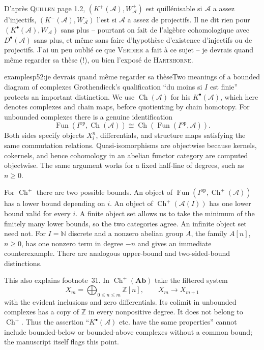 D'après \textsc{Quillen} page 1.2, $(K^{+}(\mathcal{A}),W_{\mathcal{A}}^{+})$ est quillénisable si $\mathcal{A}$ a assez d'injectifs, $(K^{-}(\mathcal{A}),W_{\mathcal{A}}^{-})$ l'est si $\mathcal{A}$ a assez de projectifs. Il ne dit rien pour $(K^{\bullet}(\mathcal{A}),W_{\mathcal{A}})$ sans plus -- pourtant on fait de l'algèbre cohomologique avec $D^{\bullet}(\mathcal{A})$ sans plus, et même sans faire d'hypothèse d'existence d'injectifs ou de projectifs. J'ai un peu oublié ce que \textsc{Verdier} a fait à ce sujet -- je devrais quand même regarder sa thèse (!), ou bien l'exposé de \textsc{Hartshorne}.

\begin{dcomment}{examples}{p52:je devrais quand même regarder sa thèse}{Two meanings of a bounded diagram of complexes}
Grothendieck's qualification ``du moins si $I$ est finie'' protects an important distinction. We use $\operatorname{Ch}(\mathcal A)$ for his $K^\bullet(\mathcal A)$, which here denotes complexes and chain maps, before quotienting by chain homotopy. For unbounded complexes there is a genuine identification
\[
 \operatorname{Fun}(I^{\mathrm{op}},\operatorname{Ch}(\mathcal A))
 \cong\operatorname{Ch}(\operatorname{Fun}(I^{\mathrm{op}},\mathcal A)).
\]
Both sides specify objects $X_i^n$, differentials, and structure maps satisfying the same commutation relations. Quasi-isomorphisms are objectwise because kernels, cokernels, and hence cohomology in an abelian functor category are computed objectwise. The same argument works for a fixed half-line of degrees, such as $n\geq0$.

For $\operatorname{Ch}^+$ there are two possible bounds. An object of $\operatorname{Fun}(I^{\mathrm{op}},\operatorname{Ch}^+(\mathcal A))$ has a lower bound depending on $i$. An object of $\operatorname{Ch}^+(\mathcal A(I))$ has one lower bound valid for every $i$. A finite object set allows us to take the minimum of the finitely many lower bounds, so the two categories agree. An infinite object set need not. For $I=\mathbb N$ discrete and a nonzero abelian group $A$, the family $A[n]$, $n\geq0$, has one nonzero term in degree $-n$ and gives an immediate counterexample. There are analogous upper-bound and two-sided-bound distinctions.

This also explains footnote~31. In $\operatorname{Ch}^+(\mathbf{Ab})$ take the filtered system
\[
 X_m=\bigoplus_{0\leq n\leq m}\mathbb Z[n],\qquad
 X_m\longrightarrow X_{m+1}
\]
with the evident inclusions and zero differentials. Its colimit in unbounded complexes has a copy of $\mathbb Z$ in every nonpositive degree. It does not belong to $\operatorname{Ch}^+$. Thus the assertion ``$K^\bullet(\mathcal A)$ etc. have the same properties'' cannot include bounded-below or bounded-above complexes without a common bound; the manuscript itself flags this point.


\end{dcomment}
